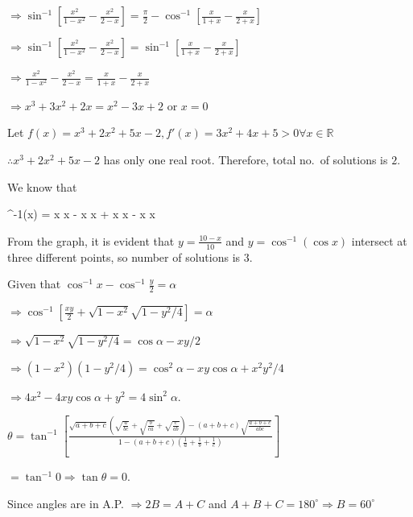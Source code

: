   $\Rightarrow \sin^{-1}\left[\frac{x^2}{1 - x^2} - \frac{x^2}{2 - x}\right] = \frac{\pi}{2}
  - \cos^{-1}\left[\frac{x}{1 + x} - \frac{x}{2 + x}\right]$

  $\Rightarrow \sin^{-1}\left[\frac{x^2}{1 - x^2} - \frac{x^2}{2 - x}\right] = \sin^{-1}\left[\frac{x}{1 +
      x} - \frac{x}{2 + x}\right]$

  $\Rightarrow \frac{x^2}{1 - x^2} - \frac{x^2}{2 - x} = \frac{x}{1 + x} - \frac{x}{2 + x}$

  $\Rightarrow x^3 + 3x^2 + 2x = x^2 - 3x + 2$ or $x = 0$

  Let $f(x) = x^3 + 2x^2 + 5x - 2, f'(x) = 3x^2 + 4x + 5 > 0\forall x\in\mathbb{R}$

  $\therefore x^3 + 2x^2 + 5x - 2$ has only one real root. Therefore, total no.\ of solutions is $2$.
\item We know that

  \startformula
    \cos^{-1}(\cos x) =
    \startcases[align={right,left},distance=3pt]
      \NC x \NC {} x\in[0, \pi]\NR
      \pi - x \NC {} x\in[\pi, 2\pi]\NR
      \pi + x \NC {} x\in[2\pi, 3\pi]\NR
      \pi - x \NC {} x\in[3\pi, 4\pi]\NR
    \stopcases
  \stopformula

  \startplacefigure
    \externalfigure[17_11.pdf]
  \stopplacefigure

  From the graph, it is evident that $y = \frac{10 - x}{10}$ and $y = \cos^{-1}(\cos x)$ intersect at three
  different points, so number of solutions is $3$.
\item Given that $\cos^{-1}x - \cos^{-1}\frac{y}{2} = \alpha$

  $\Rightarrow \cos^{-1}\left[\frac{xy}{2} + \sqrt{1- x^2}\sqrt{1 - y^2/4}\right] = \alpha$

  $\Rightarrow \sqrt{1 - x^2}\sqrt{1 - y^2/4} = \cos\alpha - xy/2$

  $\Rightarrow (1 - x^2)(1 - y^2/4) = \cos^2\alpha - xy\cos\alpha + x^2y^2/4$

  $\Rightarrow 4x^2 - 4xy\cos\alpha + y^2 = 4\sin^2\alpha$.
\item $\theta = \tan^{-1}\left[\frac{\sqrt{a + b + c}\left(\sqrt{\frac{a}{bc}} + \sqrt{\frac{b}{ca}}
    + \sqrt{\frac{c}{ab}}\right) - (a + b + c)\sqrt{\frac{a + b + c}{abc}}}{1 - (a + b +
    c)\left(\frac{1}{a} + \frac{1}{b} + \frac{1}{c}\right)}\right]$

  $= \tan^{-1}0 \Rightarrow \tan\theta = 0$.
\item Since angles are in A.P. $\Rightarrow 2B = A + C$ and $A + B + C = 180^\circ \Rightarrow B = 60^\circ$

